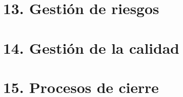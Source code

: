 \documentclass[
11pt, %
codirector, %
]{charter}
\begin{document}


\section{13. Gestión de riesgos}
\label{sec:riesgos}



\section{14. Gestión de la calidad}
\label{sec:calidad}



\section{15. Procesos de cierre}
\label{sec:cierre}


\end{document}
